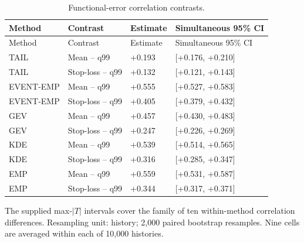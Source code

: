 \begingroup
\fontsize{8.5}{10.5}\selectfont\setlength{\tabcolsep}{3pt}
\begin{longtable}{@{}llll@{}}
\caption{Functional-error correlation contrasts.}\label{tab:final-si-7}\\
\toprule
Method & Contrast & Estimate & Simultaneous 95\% CI\\\midrule\endfirsthead
Method & Contrast & Estimate & Simultaneous 95\% CI\\\midrule\endhead
TAIL & Mean -- q99 & +0.193 & [+0.176, +0.210]\\
TAIL & Stop-loss -- q99 & +0.132 & [+0.121, +0.143]\\
EVENT-EMP & Mean -- q99 & +0.555 & [+0.527, +0.583]\\
EVENT-EMP & Stop-loss -- q99 & +0.405 & [+0.379, +0.432]\\
GEV & Mean -- q99 & +0.457 & [+0.430, +0.483]\\
GEV & Stop-loss -- q99 & +0.247 & [+0.226, +0.269]\\
KDE & Mean -- q99 & +0.539 & [+0.514, +0.565]\\
KDE & Stop-loss -- q99 & +0.316 & [+0.285, +0.347]\\
EMP & Mean -- q99 & +0.559 & [+0.531, +0.587]\\
EMP & Stop-loss -- q99 & +0.344 & [+0.317, +0.371]\\
\bottomrule
\end{longtable}
\noindent\footnotesize The supplied max-$|T|$ intervals cover the family of ten within-method correlation differences. Resampling unit: history; 2,000 paired bootstrap resamples. Nine cells are averaged within each of 10,000 histories.
\endgroup
